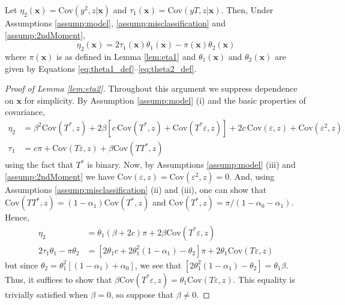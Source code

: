 \documentclass[12pt]{article}
\begin{document}

\begin{lem}
  Let $\eta_2(\mathbf{x}) = \mbox{Cov}(y^2,z|\mathbf{x})$ and $\tau_1(\mathbf{x}) = \mbox{Cov}(yT,z|\mathbf{x})$.
Then, Under Assumptions \ref{assump:model}, \ref{assump:misclassification} and \ref{assump:2ndMoment}, 
\[
    \eta_2(\mathbf{x}) =  2\tau_1(\mathbf{x}) \theta_1(\mathbf{x}) - \pi(\mathbf{x})\theta_2(\mathbf{x})
\]
where $\pi(\mathbf{x})$ is as defined in Lemma \ref{lem:eta1} and $\theta_1(\mathbf{x})$ and $\theta_2(\mathbf{x})$ are given by Equations \ref{eq:theta1_def}--\ref{eq:theta2_def}.
  \label{lem:eta2}
\end{lem}

\begin{proof}[Proof of Lemma \ref{lem:eta2}]
  Throughout this argument we suppress dependence on $\mathbf{x}$ for simplicity. 
  By Assumption \ref{assump:model} (i) and the basic properties of covariance, 
\begin{align*}
    \eta_2 &= \beta^2 \mbox{Cov}(T^*,z) + 2 \beta\left[ c\, \mbox{Cov}(T^*,z) + \mbox{Cov}(T^*\varepsilon,z)  \right] + 2c \, \mbox{Cov}(\varepsilon,z) + \mbox{Cov}(\varepsilon^2,z)\\
  \tau_1 &= c \pi + \mbox{Cov}(T\varepsilon,z) + \beta \mbox{Cov}(TT^*,z)
\end{align*}
using the fact that $T^*$ is binary. 
Now, by Assumptions \ref{assump:model} (iii) and \ref{assump:2ndMoment} we have $\mbox{Cov}(\varepsilon,z) = \mbox{Cov}(\varepsilon^2,z) = 0$.
And, using Assumptions \ref{assump:misclassification} (ii) and (iii), one can show that $\mbox{Cov}(TT^*,z) = (1 - \alpha_1)\mbox{Cov}(T^*,z)$ and $\mbox{Cov}(T^*,z) = \pi/(1 - \alpha_0 - \alpha_1)$.
Hence, 
\begin{align*}
  \eta_2 &= \theta_1\left( \beta 
+ 2 c \right) \pi + 2\beta \mbox{Cov}(T^*\varepsilon,z) \\
  2 \tau_1 \theta_1 - \pi \theta_2 &= \left[2\theta_1 c + 2 \theta_1^2 (1 - \alpha_1) - \theta_2\right]\pi + 2\theta_1 \mbox{Cov}(T\varepsilon,z) 
\end{align*}
but since $\theta_2 = \theta_1^2 \left[ (1 - \alpha_1) + \alpha_0 \right]$, we see that $[2\theta_1^2(1 - \alpha_1) - \theta_2] = \theta_1 \beta$.
Thus, it suffices to show that $\beta \mbox{Cov}(T^*\varepsilon,z) = \theta_1 \mbox{Cov}(T\varepsilon,z)$.
This equality is trivially satisfied when $\beta=0$, so suppose that $\beta \neq 0$. 

\end{proof}
\end{document}

